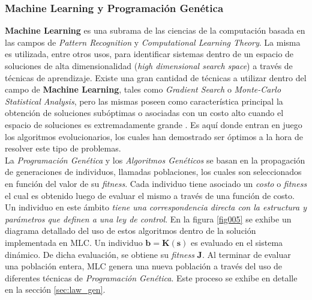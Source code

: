\documentclass[a4paper,10pt]{article}
\begin{document}
    \subsubsection{Machine Learning y Programación Genética} \label{sec:mlc_and_gp}
        \textbf{Machine Learning} es una subrama de las ciencias de la computación basada en las campos de \textit{Pattern Recognition} y
        \textit{Computational Learning Theory}. La misma es utilizada, entre otros usos, para identificar sistemas dentro de un espacio de
        soluciones de alta dimensionalidad (\textit{high dimensional search space}) a través de técnicas de aprendizaje. Existe una gran
        cantidad de técnicas a utilizar dentro del campo de \textbf{Machine Learning}, tales como \textit{Gradient Search} o
        \textit{Monte-Carlo Statistical Analysis}, pero las mismas poseen como característica principal la obtención de soluciones
        subóptimas o asociadas con un costo alto cuando el espacio de soluciones es extremadamente grande \cite{Duriez2016}. Es aquí
        donde entran en juego los algoritmos
        evolucionarios, los cuales han demostrado ser óptimos a la hora de resolver este tipo de problemas. \\

        \indent La \textit{Programación Genética} y los \textit{Algoritmos Genéticos} se basan en la propagación de generaciones de
        individuos, llamadas poblaciones, los cuales son seleccionados en función del valor de su \textit{fitness}. Cada individuo tiene
        asociado un \textit{costo} o \textit{fitness} el cual es obtenido luego de evaluar el mismo a través de una función de costo.
        Un individuo en este ámbito \textit{tiene una correspondencia directa con la estructura y parámetros que definen
        a una ley de control}. En la figura \ref{fig005} se exhibe un diagrama detallado del uso de estos algoritmos dentro de la solución
        implementada en MLC. Un individuo $\mathbf{b = K(s)}$ es evaluado en el sistema dinámico. De dicha evaluación, se obtiene su
        \textit{fitness} \textbf{J}. Al terminar de evaluar una población entera, MLC genera una nueva población a través del uso de
        diferentes técnicas de \textit{Programación Genética}. Este proceso se exhibe en detalle en la sección \ref{sec:law_gen}.
\end{document}
